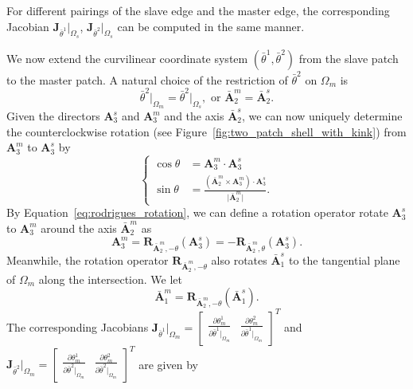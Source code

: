 For different pairings of the slave edge and the master edge, the corresponding Jacobian $\mathbf{J}_{\bar{\theta}^1}\vert_{\Omega_s}$, $\mathbf{J}_{\bar{\theta}^2}\vert_{\Omega_s}$ can be computed in the same manner. \par

We now extend the curvilinear coordinate system $(\bar{\theta}^1, \bar{\theta}^2)$ from the slave patch to the master patch. A natural choice of the restriction of $\bar{\theta}^2$ on $\Omega_m$ is
\begin{equation}
	\bar{\theta}^2\vert_{\Omega_m}=\bar{\theta}^2\vert_{\Omega_s}, \text{ or } \bar{\mathbf{A}}^m_2=\bar{\mathbf{A}}^s_2.
\end{equation}
Given the directors $\mathbf{A}^s_3$ and $\mathbf{A}^m_3$ and the axis $\bar{\mathbf{A}}^s_2$, we can now uniquely determine the counterclockwise rotation (see Figure~\ref{fig:two_patch_shell_with_kink}) from $\mathbf{A}^m_3$ to $\mathbf{A}^s_3$ by
\begin{equation}
	\left\{
	\begin{split}
		\cos{\theta} &= \mathbf{A}^m_3\cdot \mathbf{A}^s_3\\
		\sin{\theta} &= \frac{(\bar{\mathbf{A}}^m_2 \times \mathbf{A}^m_3) \cdot \mathbf{A}^s_3}{\vert \bar{\mathbf{A}}^m_2 \vert}.
	\end{split}
	\right.\label{eq:rotation_angle}
\end{equation}
By Equation~\eqref{eq:rodrigues_rotation}, we can define a rotation operator rotate $\mathbf{A}^s_3$ to $\mathbf{A}^m_3$ around the axis $\bar{\mathbf{A}}^m_2$ as
\begin{equation}
	\mathbf{A}^m_3 = \mathbf{R}_{\bar{\mathbf{A}}^m_2,-\theta}(\mathbf{A}^s_3) =  -\mathbf{R}_{\bar{\mathbf{A}}^m_2,\theta}(\mathbf{A}^s_3).
\end{equation}
Meanwhile, the rotation operator $\mathbf{R}_{\bar{\mathbf{A}}^m_2,-\theta}$ also rotates $\bar{\mathbf{A}}^s_1$ to the tangential plane of $\Omega_m$ along the intersection. We let
\begin{equation}
	\bar{\mathbf{A}}^m_1=\mathbf{R}_{\bar{\mathbf{A}}^m_2,-\theta}(\bar{\mathbf{A}}^s_1).\label{eq:reference_constraint_c1}
\end{equation}
The corresponding Jacobians $\mathbf{J}_{\bar{\theta}^1}\vert_{\Omega_m} = \begin{bmatrix}
		\frac{\partial \theta^1_m}{\partial \bar{\theta}^1\vert_{\Omega_m}} & \frac{\partial \theta^2_m}{\partial \bar{\theta}^1\vert_{\Omega_m}}
	\end{bmatrix}^T$ and $\mathbf{J}_{\bar{\theta}^2}\vert_{\Omega_m} = \begin{bmatrix}
		\frac{\partial \theta^1_m}{\partial \bar{\theta}^2\vert_{\Omega_m}} & \frac{\partial \theta^2_m}{\partial \bar{\theta}^2\vert_{\Omega_m}}
	\end{bmatrix}^T$ are given by
